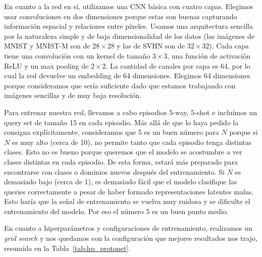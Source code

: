 \documentclass[12pt]{article}
\begin{document}
En cuanto a la red en sí, utilizamos una CNN básica con cuatro capas. Elegimos usar convoluciones en dos dimensiones porque estas son buenas capturando información espacial y relaciones entre píxeles. Usamos una arquitectura sencilla por la naturaleza simple y de baja dimensionalidad de los datos (las imágenes de MNIST y MNIST-M son de $28 \times 28$ y las de SVHN son de $32 \times 32$). Cada capa tiene una convolución con un kernel de tamaño $3 \times 3$, una función de activación ReLU y un max pooling de $2 \times 2$. La cantidad de canales por capa es 64, por lo cual la red devuelve un embedding de 64 dimensiones. Elegimos 64 dimensiones porque consideramos que sería suficiente dado que estamos trabajando con imágenes sencillas y de muy baja resolución.

Para entrenar nuestra red, llevamos a cabo episodios 5-way, 5-shot e incluímos un query set de tamaño 15 en cada episodio. Más allá de que lo haya pedido la consigna explícitamente, consideramos que 5 es un buen número para $N$ porque si $N$ es muy alto (cerca de 10), no permite tanto que cada episodio tenga distintas clases. Esto no es bueno porque queremos que el modelo se acostumbre a ver clases distintas en cada episodio. De esta forma, estará más preparado para encontrarse con clases o dominios nuevos después del entrenamiento. Si $N$ es demasiado bajo (cerca de 1), es demasiado fácil que el modelo clasifique las queries correctamente a pesar de haber formado representaciones latentes malas. Esto haría que la señal de entrenamiento se vuelva muy ruidosa y se dificulte el entrenamiento del modelo. Por eso el número 5 es un buen punto medio.

En cuanto a hiperparámetros y configuraciones de entrenamiento, realizamos un \textit{grid search} y nos quedamos con la configuración que mejores resultados nos trajo, resumida en la Tabla~\ref{tab:hp_protonet}.
\end{document}
